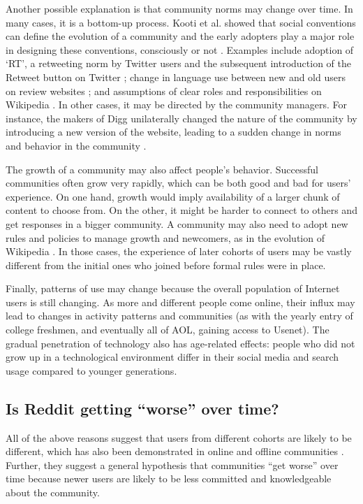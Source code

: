 Another possible explanation is that community norms may change over time.  In many cases, it is a bottom-up process. Kooti et al. showed that social conventions can define the evolution of a community and the early adopters play a major role in designing these conventions, consciously or not \cite{Kooti2010}. Examples include adoption of `RT', a retweeting norm by Twitter users and the subsequent introduction of the Retweet button on Twitter \cite{Kooti2010}; change in language use between new and old users on review websites \cite{Danescu-niculescu-mizil2013}; and assumptions of clear roles and responsibilities on Wikipedia \cite{Kittur2007a}. In other cases, it may be directed by the community managers. For instance, the makers of Digg unilaterally changed the nature of the community by introducing a new version of the website, leading to a sudden change in norms and behavior in the community \cite{Ingram2014,Lardinois2014}. 

The growth of a community may also affect people's behavior. Successful communities often grow very rapidly, which can be both good and bad for users' experience. On one hand, growth would imply availability of a larger chunk of content to choose from. On the other, it might be harder to connect to others and get responses in a bigger community. A community may also need to adopt new rules and policies to manage growth and newcomers, as in the evolution of Wikipedia \cite{Choi2010,Bryant2005}. In those cases, the experience of later cohorts of users may be vastly different from the initial ones who joined before formal rules were in place. 

Finally, patterns of use may change because the overall population of Internet users is still changing.  As more and different people come online, their influx may lead to changes in activity patterns and communities (as with the yearly entry of college freshmen, and eventually all of AOL, gaining access to Usenet).  The gradual penetration of technology also has age-related effects:  people who did not grow up in a technological environment differ in their social media and search usage compared to younger generations\cite{Correa2010,Beldona2005}. 

\subsection{Is Reddit getting ``worse'' over time?}
All of the above reasons suggest that users from different cohorts are likely to be different, which has also been demonstrated in online and offline communities \cite{Ryder1965,Danescu-niculescu-mizil2013,Prensky2001,Correa2010}.  Further, they suggest a general hypothesis that communities ``get worse'' over time because newer users are likely to be less committed and knowledgeable about the community. 

